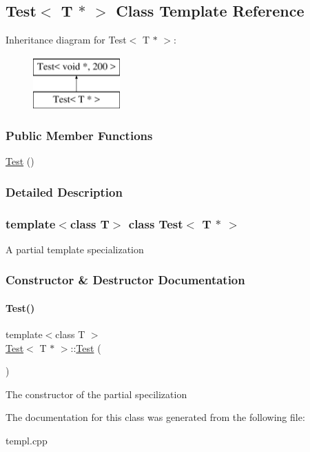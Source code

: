 \hypertarget{class_test_3_01_t_01_5_01_4}{}\subsection{Test$<$ T $\ast$ $>$ Class Template Reference}
\label{class_test_3_01_t_01_5_01_4}
Inheritance diagram for Test$<$ T $\ast$ $>$\+:\begin{figure}[H]
\begin{center}
\leavevmode
\includegraphics[height=2.000000cm]{class_test_3_01_t_01_5_01_4}
\end{center}
\end{figure}
\subsubsection*{Public Member Functions}
\begin{DoxyCompactItemize}
\item 
\mbox{\hyperlink{class_test_3_01_t_01_5_01_4_a474e8a1211308b3f810f9eafced6cbe7}{Test}} ()
\end{DoxyCompactItemize}


\subsubsection{Detailed Description}
\subsubsection*{template$<$class T$>$\newline
class Test$<$ T $\ast$ $>$}

A partial template specialization 

\subsubsection{Constructor \& Destructor Documentation}
\mbox{\label{class_test_3_01_t_01_5_01_4_a474e8a1211308b3f810f9eafced6cbe7}} 
\paragraph{\texorpdfstring{Test()}{Test()}}
{\footnotesize\ttfamily template$<$class T $>$ \\
\mbox{\hyperlink{class_test}{Test}}$<$ T $\ast$ $>$\+::\mbox{\hyperlink{class_test}{Test}} (\begin{DoxyParamCaption}{ }\end{DoxyParamCaption})}

The constructor of the partial specilization 

The documentation for this class was generated from the following file\+:\begin{DoxyCompactItemize}
\item 
templ.\+cpp\end{DoxyCompactItemize}
